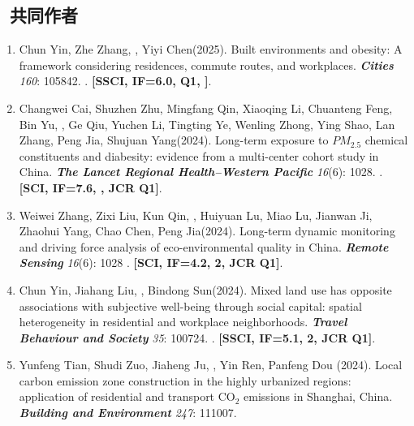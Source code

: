 \subsection*{\texorpdfstring{\faBook\ 共同作者}{共同作者}}
\begin{enumerate}
\item
    Chun Yin\CS, Zhe Zhang, \Shaoqing, Yiyi Chen\CS (2025).
    Built environments and obesity: A framework considering residences, commute routes, and workplaces.
    \textbf{\textit{Cities}} \textit{160}: 105842.
    . \textbf{[SSCI, IF=6.0, Q1, ]}.
\item
    Changwei Cai\CF, Shuzhen Zhu\CF, Mingfang Qin\CF, Xiaoqing Li\CF, Chuanteng Feng, Bin Yu, \Shaoqing, Ge Qiu, Yuchen Li, Tingting Ye, Wenling Zhong, Ying Shao, Lan Zhang, Peng Jia\CS, Shujuan Yang\CS (2024).
    Long-term exposure to $PM_{2.5}$ chemical constituents and diabesity: evidence from a multi-center cohort study in China. 
    \textbf{\textit{The Lancet Regional Health–Western Pacific}} \textit{16}(6): 1028.
    . \textbf{[SCI, IF=7.6, , JCR Q1]}.
\item
    Weiwei Zhang, Zixi Liu, Kun Qin, \Shaoqing, Huiyuan Lu, Miao Lu, Jianwan Ji, Zhaohui Yang, Chao Chen, Peng Jia\CS (2024).
    Long-term dynamic monitoring and driving force analysis of eco-environmental quality in China. 
    \textbf{\textit{Remote Sensing}} \textit{16}(6): 1028
    . 
    \textbf{[SCI, IF=4.2, 2, JCR Q1]}.
\item
    Chun Yin, Jiahang Liu, \Shaoqing, Bindong Sun\CS (2024).
    Mixed land use has opposite associations with subjective well-being through social capital: spatial heterogeneity in residential and workplace neighborhoods.
    \textbf{\textit{Travel Behaviour and Society}} \textit{35}: 100724.
    . 
    \textbf{[SSCI, IF=5.1, 2, JCR Q1]}.
\item
    Yunfeng Tian, Shudi Zuo\CS, Jiaheng Ju, \Shaoqing, Yin Ren, Panfeng Dou (2024).
    Local carbon emission zone construction in the highly urbanized regions: application of residential and transport CO$_2$ emissions in Shanghai, China.
    \textbf{\textit{Building and Environment}} \textit{247}: 111007.

\end{enumerate}
